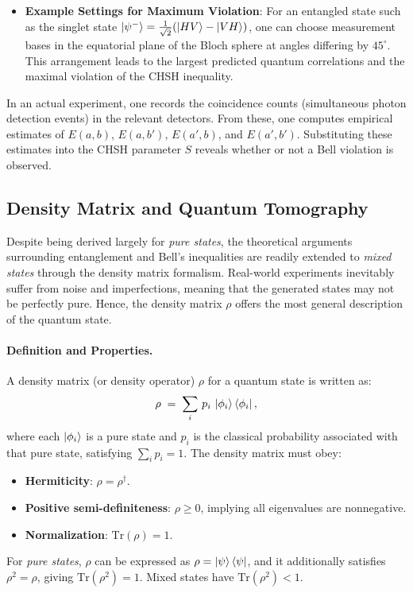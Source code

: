 \begin{itemize}
    \item \textbf{Example Settings for Maximum Violation}: For an entangled state such as the singlet state $\ket{\psi^-}=\frac{1}{\sqrt{2}}(\ket{HV}-\ket{VH})$, one can choose measurement bases in the equatorial plane of the Bloch sphere at angles differing by $45^\circ$. This arrangement leads to the largest predicted quantum correlations and the maximal violation of the CHSH inequality.
\end{itemize}

\noindent
In an actual experiment, one records the coincidence counts (simultaneous photon detection events) in the relevant detectors. From these, one computes empirical estimates of $E(a,b)$, $E(a,b')$, $E(a',b)$, and $E(a',b')$. Substituting these estimates into the CHSH parameter $S$ reveals whether or not a Bell violation is observed.

\subsection{Density Matrix and Quantum Tomography}
Despite being derived largely for \emph{pure states}, the theoretical arguments surrounding entanglement and Bell's inequalities are readily extended to \emph{mixed states} through the density matrix formalism. Real-world experiments inevitably suffer from noise and imperfections, meaning that the generated states may not be perfectly pure. Hence, the density matrix $\rho$ offers the most general description of the quantum state.

\paragraph{Definition and Properties.}
A density matrix (or density operator) $\rho$ for a quantum state is written as:
\[
\rho \;=\; \sum_i \,p_i\,\ket{\phi_i}\bra{\phi_i},
\]
where each $\ket{\phi_i}$ is a pure state and $p_i$ is the classical probability associated with that pure state, satisfying $\sum_i p_i=1$. The density matrix must obey:
\begin{itemize}
    \item \textbf{Hermiticity}: $\rho = \rho^\dagger$. 
    \item \textbf{Positive semi-definiteness}: $\rho \ge 0$, implying all eigenvalues are nonnegative.
    \item \textbf{Normalization}: $\mathrm{Tr}(\rho) = 1$.
\end{itemize}
For \emph{pure states}, $\rho$ can be expressed as $\rho=\ket{\psi}\bra{\psi}$, and it additionally satisfies $\rho^2=\rho$, giving $\mathrm{Tr}(\rho^2)=1$. Mixed states have $\mathrm{Tr}(\rho^2) <1$.

